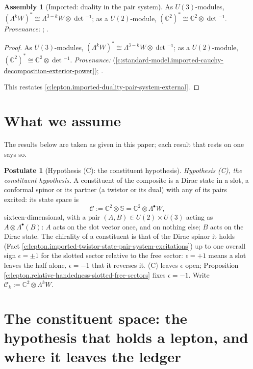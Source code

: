 \documentclass[11pt]{article}
\theoremstyle{definition}
\newtheorem{assembled}[theorem]{Assembly}
\newtheorem{postulate}[theorem]{Postulate}
\theoremstyle{plain}
\providecommand{\C}{}\renewcommand{\C}{\mathbb{C}}
\providecommand{\Con}{}\renewcommand{\Con}{\mathcal{C}}
\providecommand{\Sp}{}\renewcommand{\Sp}{\mathbb{S}}
\begin{document}
\begin{assembled}[Imported: duality in the pair system]\label{c:lepton.imported-duality-pair-system}
As $U(3)$-modules, $(\Lambda^{k}W)^{*} \cong \Lambda^{3-k}W \otimes \det{}^{-1}$; as a $U(2)$-module, $(\C^{2})^{*} \cong \C^{2} \otimes \det{}^{-1}$. \emph{Provenance:} \cite[Fact~2.6]{ButlerT12}; \cite[\S 6.1, \S 15.3]{FultonHarris1991}.
\end{assembled}
\begin{proof}
As $U(3)$-modules, $(\Lambda^{k}W)^{*} \cong \Lambda^{3-k}W \otimes \det{}^{-1}$; as a $U(2)$-module, $(\C^{2})^{*} \cong \C^{2} \otimes \det{}^{-1}$. \emph{Provenance:} \cite[Fact~2.6]{ButlerT12} (\ref{c:standard-model.imported-cauchy-decomposition-exterior-power}); \cite[\S 6.1, \S 15.3]{FultonHarris1991}.

This restates \ref{c:lepton.imported-duality-pair-system-external}.

\end{proof}

\section*{What we assume}
The results below are taken as given in this paper; each result that rests on one says so.
\begin{postulate}[Hypothesis (C): the constituent hypothesis]\label{c:lepton.hyp-c-constituent}
\emph{Hypothesis (C), the constituent hypothesis.} A constituent of the composite is a Dirac state in a slot, a conformal spinor or its partner (a twistor or its dual) with any of its pairs excited: its state space is
\[
\Con := \C^{2} \otimes \Sp = \C^{2} \otimes \Lambda^{\bullet}W,
\]
sixteen-dimensional, with a pair $(A, B) \in U(2) \times U(3)$ acting as $A \otimes \Lambda^{\bullet}(B)$: $A$ acts on the slot vector once, and on nothing else; $B$ acts on the Dirac state. The chirality of a constituent is that of the Dirac spinor it holds (Fact \ref{c:lepton.imported-twistor-state-pair-system-excitations}) up to one overall sign $\epsilon = \pm 1$ for the slotted sector relative to the free sector: $\epsilon = +1$ means a slot leaves the half alone, $\epsilon = -1$ that it reverses it. (C) leaves $\epsilon$ open; Proposition \ref{c:lepton.relative-handedness-slotted-free-sectors} fixes $\epsilon = -1$. Write $\Con_{k} := \C^{2} \otimes \Lambda^{k}W$.
\end{postulate}

\section{The constituent space: the hypothesis that holds a lepton, and where it leaves the ledger}
\end{document}
